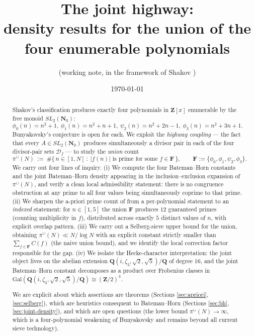 \documentclass[11pt]{article}
\title{The joint highway: \\
density results for the union of the four enumerable polynomials}
\author{(working note, in the framework of Shakov \cite{shakov})}
\date{\today}
\theoremstyle{definition}
\newcommand{\Nz}{\mathbf{N}_0}
\newcommand{\Z}{\mathbf{Z}}
\newcommand{\Q}{\mathbf{Q}}
\newcommand{\F}{\mathbf{F}}
\newcommand{\SLNz}{SL_2(\Nz)}
\newcommand{\Df}{\mathcal{D}_f}
\newcommand{\F}{\mathcal{F}}
\begin{document}
\maketitle

\begin{abstract}
Shakov's classification \cite{shakov} produces exactly four polynomials in $\Z[x]$ enumerable by the free monoid $\SLNz$:
\[
\phi_0(n)=n^2+1,\ \phi_1(n)=n^2+n+1,\ \psi_2(n)=n^2+2n-1,\ \phi_3(n)=n^2+3n+1.
\]
Bunyakovsky's conjecture is open for each. We exploit the \emph{highway coupling} --- the fact that every $A\in\SLNz$ produces simultaneously a divisor pair in each of the four divisor-pair sets $\Df$ --- to study the \emph{union} count
\[
\pi^\cup(N)\ :=\ \#\{\,n\in[1,N]\ :\ |f(n)|\text{ is prime for some }f\in\F\,\},\qquad \F:=\{\phi_0,\phi_1,\psi_2,\phi_3\}.
\]
We carry out four lines of inquiry.
(i) We compute the four Bateman--Horn constants and the joint Bateman--Horn density appearing in the inclusion--exclusion expansion of $\pi^\cup(N)$, and verify a clean local admissibility statement: there is no congruence obstruction at any prime to all four values being simultaneously coprime to that prime.
(ii) We sharpen the a-priori prime count of \cite{B8} from a per-polynomial statement to an \emph{indexed} statement: for $n\in[1,5]$ the union $\F$ produces $12$ guaranteed primes (counting multiplicity in $f$), distributed across exactly $5$ distinct values of $n$, with explicit overlap pattern.
(iii) We carry out a Selberg-sieve upper bound for the union, obtaining $\pi^\cup(N)\ll N/\log N$ with an explicit constant strictly smaller than $\sum_{f\in\F} C(f)$ (the naive union bound), and we identify the local correction factor responsible for the gap.
(iv) We isolate the Hecke-character interpretation: the joint object lives on the abelian extension $\Q(i,\zeta_3,\sqrt 2,\sqrt 5)/\Q$ of degree $16$, and the joint Bateman--Horn constant decomposes as a product over Frobenius classes in $\mathrm{Gal}(\Q(i,\zeta_3,\sqrt 2,\sqrt 5)/\Q)\cong (\Z/2)^4$.

We are explicit about which assertions are theorems (Sections \ref{sec:apriori}, \ref{sec:selberg}), which are heuristics consequent to Bateman--Horn (Sections \ref{sec:bh}, \ref{sec:joint-density}), and which are open questions (the lower bound $\pi^\cup(N)\to\infty$, which is a four-polynomial weakening of Bunyakovsky and remains beyond all current sieve technology).
\end{abstract}

\tableofcontents
\end{document}
